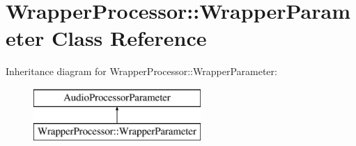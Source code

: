 \hypertarget{class_wrapper_processor_1_1_wrapper_parameter}{}\section{Wrapper\+Processor\+:\+:Wrapper\+Parameter Class Reference}
\label{class_wrapper_processor_1_1_wrapper_parameter}
Inheritance diagram for Wrapper\+Processor\+:\+:Wrapper\+Parameter\+:\begin{figure}[H]
\begin{center}
\leavevmode
\includegraphics[height=2.000000cm]{class_wrapper_processor_1_1_wrapper_parameter}
\end{center}
\end{figure}
